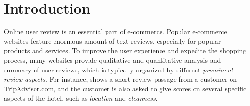 \section{Introduction}
\label{sec:intro}

Online user review is an essential part of e-commerce. 
Popular e-commerce websites feature enormous amount of text reviews, especially for popular products and services. 
To improve the user experience and expedite the
shopping process, many websites provide qualitative and quantitative
analysis and summary of user reviews, which is typically organized by different 
{\em prominent review aspects}.
For instance,  shows a short review passage from a customer on TripAdvisor.com, and the customer is also asked
to give scores on several specific aspects of 
the hotel, such as \textit{location} and \textit{cleanness}. 

